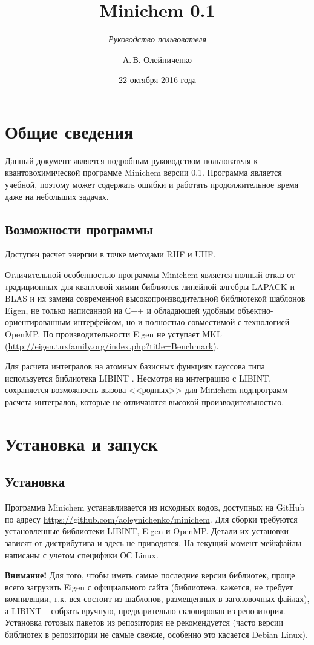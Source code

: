 \documentclass[a4paper]{book}
\title{Minichem 0.1}
\subtitle{\textit{Руководство пользователя}}
\author{А.\,В. Олейниченко}
\date{22 октября 2016 года}
\begin{document}
\maketitle

\chapter{Общие сведения}
Данный документ является подробным руководством пользователя к квантовохимической программе Minichem версии 0.1.
Программа является учебной, поэтому может содержать ошибки и работать продолжительное время даже на небольших задачах.

\section{Возможности программы}
Доступен расчет энергии в точке методами RHF и UHF.

Отличительной особенностью программы Minichem является полный отказ от традиционных для квантовой химии библиотек линейной алгебры
LAPACK и BLAS и их замена современной высокопроизводительной библиотекой шаблонов Eigen, не только написанной на С++ и обладающей удобным
объектно-ориентированным интерфейсом, но и полностью совместимой с технологией OpenMP. По производительности Eigen не уступает MKL
(\url{http://eigen.tuxfamily.org/index.php?title=Benchmark}).

Для расчета интегралов на атомных базисных функциях гауссова типа используется библиотека LIBINT \cite{libint2}. Несмотря на интеграцию с LIBINT,
сохраняется возможность вызова <<родных>> для Minichem подпрограмм расчета интегралов, которые не отличаются высокой производительностью.

\chapter{Установка и запуск}
\section{Установка}
Программа Minichem устанавливается из исходных кодов, доступных на GitHub по адресу \url{https://github.com/aoleynichenko/minichem}.
Для сборки требуются установленные библиотеки LIBINT, Eigen и OpenMP. Детали их установки зависят от дистрибутива и здесь не приводятся.
На текущий момент мейкфайлы написаны с учетом специфики ОС Linux.

\textbf{Внимание!} Для того, чтобы иметь самые последние версии библиотек, проще всего загрузить Eigen с официального сайта (библиотека,
кажется, не требует компиляции, т.к. вся состоит из шаблонов, размещенных в заголовочных файлах), а LIBINT -- собрать вручную,
предварительно склонировав из репозитория. Установка готовых пакетов из репозитория не рекомендуется (часто версии библиотек в репозитории
не самые свежие, особенно это касается Debian Linux).
\end{document}
